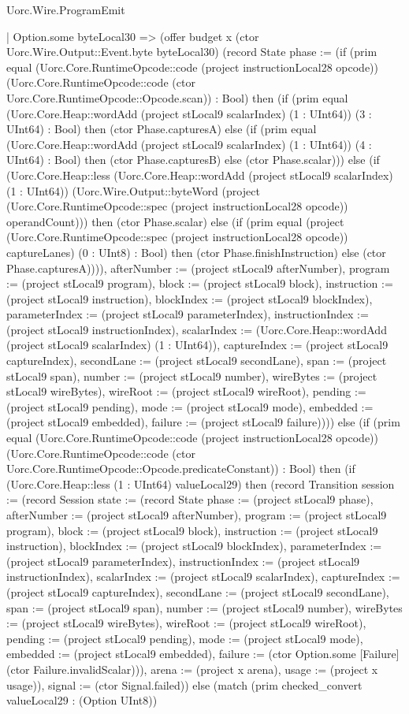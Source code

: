 \begin{lexlean}{Uorc.Wire.ProgramEmit}
\begin{semanticmodule}
{            | Option.some byteLocal30 => (offer budget x (ctor Uorc.Wire.Output::Event.byte byteLocal30) (record State {phase := (if (prim equal (Uorc.Core.RuntimeOpcode::code (project instructionLocal28 opcode)) (Uorc.Core.RuntimeOpcode::code (ctor Uorc.Core.RuntimeOpcode::Opcode.scan)) : Bool) then (if (prim equal (Uorc.Core.Heap::wordAdd (project stLocal9 scalarIndex) (1 : UInt64)) (3 : UInt64) : Bool) then (ctor Phase.capturesA) else (if (prim equal (Uorc.Core.Heap::wordAdd (project stLocal9 scalarIndex) (1 : UInt64)) (4 : UInt64) : Bool) then (ctor Phase.capturesB) else (ctor Phase.scalar))) else (if (Uorc.Core.Heap::less (Uorc.Core.Heap::wordAdd (project stLocal9 scalarIndex) (1 : UInt64)) (Uorc.Wire.Output::byteWord (project (Uorc.Core.RuntimeOpcode::spec (project instructionLocal28 opcode)) operandCount))) then (ctor Phase.scalar) else (if (prim equal (project (Uorc.Core.RuntimeOpcode::spec (project instructionLocal28 opcode)) captureLanes) (0 : UInt8) : Bool) then (ctor Phase.finishInstruction) else (ctor Phase.capturesA)))), afterNumber := (project stLocal9 afterNumber), program := (project stLocal9 program), block := (project stLocal9 block), instruction := (project stLocal9 instruction), blockIndex := (project stLocal9 blockIndex), parameterIndex := (project stLocal9 parameterIndex), instructionIndex := (project stLocal9 instructionIndex), scalarIndex := (Uorc.Core.Heap::wordAdd (project stLocal9 scalarIndex) (1 : UInt64)), captureIndex := (project stLocal9 captureIndex), secondLane := (project stLocal9 secondLane), span := (project stLocal9 span), number := (project stLocal9 number), wireBytes := (project stLocal9 wireBytes), wireRoot := (project stLocal9 wireRoot), pending := (project stLocal9 pending), mode := (project stLocal9 mode), embedded := (project stLocal9 embedded), failure := (project stLocal9 failure)}))) else (if (prim equal (Uorc.Core.RuntimeOpcode::code (project instructionLocal28 opcode)) (Uorc.Core.RuntimeOpcode::code (ctor Uorc.Core.RuntimeOpcode::Opcode.predicateConstant)) : Bool) then (if (Uorc.Core.Heap::less (1 : UInt64) valueLocal29) then (record Transition {session := (record Session {state := (record State {phase := (project stLocal9 phase), afterNumber := (project stLocal9 afterNumber), program := (project stLocal9 program), block := (project stLocal9 block), instruction := (project stLocal9 instruction), blockIndex := (project stLocal9 blockIndex), parameterIndex := (project stLocal9 parameterIndex), instructionIndex := (project stLocal9 instructionIndex), scalarIndex := (project stLocal9 scalarIndex), captureIndex := (project stLocal9 captureIndex), secondLane := (project stLocal9 secondLane), span := (project stLocal9 span), number := (project stLocal9 number), wireBytes := (project stLocal9 wireBytes), wireRoot := (project stLocal9 wireRoot), pending := (project stLocal9 pending), mode := (project stLocal9 mode), embedded := (project stLocal9 embedded), failure := (ctor Option.some [Failure] (ctor Failure.invalidScalar))}), arena := (project x arena), usage := (project x usage)}), signal := (ctor Signal.failed)}) else (match (prim checked_convert valueLocal29 : (Option UInt8))
}
\end{semanticmodule}
\end{lexlean}
